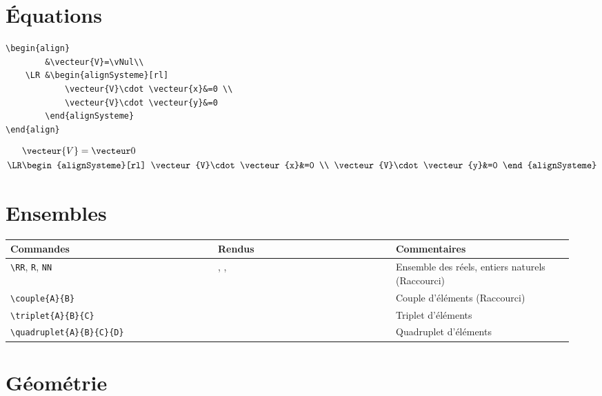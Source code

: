 \documentclass[a4paper,10pt]{article}
\newcommand{\rac}{({\color{red}Raccourci})}
\begin{document}
	\section{Équations}
		
			\noindent
			\begin{verbatim}
\begin{align}
		&\vecteur{V}=\vNul\\
	\LR	&\begin{alignSysteme}[rl]
			\vecteur{V}\cdot \vecteur{x}&=0	\\
			\vecteur{V}\cdot \vecteur{y}&=0
	   	\end{alignSysteme}
\end{align}
			\end{verbatim}
			
\begin{align}
		&\vecteur{V}=\vNul\\
	\LR	&\begin{alignSysteme}[rl]
			\vecteur{V}\cdot \vecteur{x}&=0	\\
			\vecteur{V}\cdot \vecteur{y}&=0
	   	\end{alignSysteme}
\end{align}
	\section{Ensembles}

	\noindent
	\begin{tabular}{|p{0.35\linewidth}|p{0.3\linewidth}|p{0.3\linewidth}|}
		\hline
			\textbf{Commandes}&\textbf{Rendus}&\textbf{Commentaires}
		\\\hline\hline
			\verb!\RR!, \verb!R!, \verb!NN!	&	\RR, \R, \NN		&	Ensemble des réels, entiers naturels \rac
		\\\hline
			\verb!\couple{A}{B}!	&	\couple{A}{B}		&	Couple d'éléments \rac
		\\\hline
			\verb!\triplet{A}{B}{C}!	&	\triplet{A}{B}{C}			&	Triplet d'éléments
		\\\hline
			\verb!\quadruplet{A}{B}{C}{D}!		&	\quadruplet{A}{B}{C}{D}			&	Quadruplet d'éléments
		\\\hline
	\end{tabular}



	\section{Géométrie}
\end{document}
